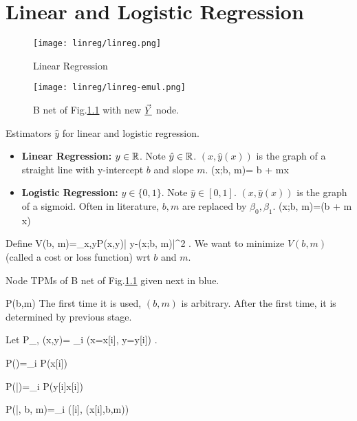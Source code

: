 \chapter{Linear and Logistic Regression}

\begin{figure}[h!]
\centering
\texttt{[image: linreg/linreg.png]}
\caption{Linear Regression} 
\label{fig-linreg}
\end{figure}

\begin{figure}[h!]
\centering
\texttt{[image: linreg/linreg-emul.png]}
\caption{B net of Fig.\ref{fig-linreg}  with new $\vec{\underline{Y}}$ node.}\label{fig-linreg-emul}
\end{figure}



Estimators $\hat{y}$ for linear and logistic regression.
\begin{itemize}
\item 

\textbf{Linear Regression:} $y\in { \mathbb{R}}$. 
Note $\hat{y}\in { \mathbb{R}}$. $(x,\hat{y}(x))$ is
the graph
of a straight line 
with y-intercept $b$ and slope $m$.
\beq
{}(x;b, m)= b + mx
\eeq

\item
\textbf{Logistic Regression:} $y\in\{0, 1\}$. Note $\hat{y}\in [0,1]$. $
(x,\hat{y}(x))$ is the graph
of a sigmoid.
 Often in literature, $b,m$ are replaced by $\beta_0, \beta_1$. 
\beq
{}(x;b, m)=\sig(b + m x)
\eeq
\end{itemize}

Define
\beq
V(b, m)=\sum_{x,y}P(x,y)| y-(x;b, m)|^2
\;.\label{eq-norm-cost}
\eeq
We want to minimize $V(b,m)$ (called a cost or loss function) wrt $b$ and $m$.


Node TPMs of B net of Fig.\ref{fig-linreg}
given next in blue.

\beq\color{blue}
P(b,m) 
\eeq
The first time it is used, 
$(b,m)$ is arbitrary.
After the first time, it is determined 
by previous stage.

Let 
\beq
P_{\rvx, \rvy}(x,y)=
\sum_i \indi(x=x[i], y=y[i])
\;.
\eeq

\beq\color{blue}
P(\vecx)=\prod_i P(x[i])
\eeq

\beq\color{blue}
P(\vecy|\vecx)=\prod_i P(y[i]\cond x[i])
\eeq

\beq\color{blue}
P(|\vecx, b, m)=\prod_i \delta([i], (x[i],b,m))
\label{eq-replace1}
\eeq

